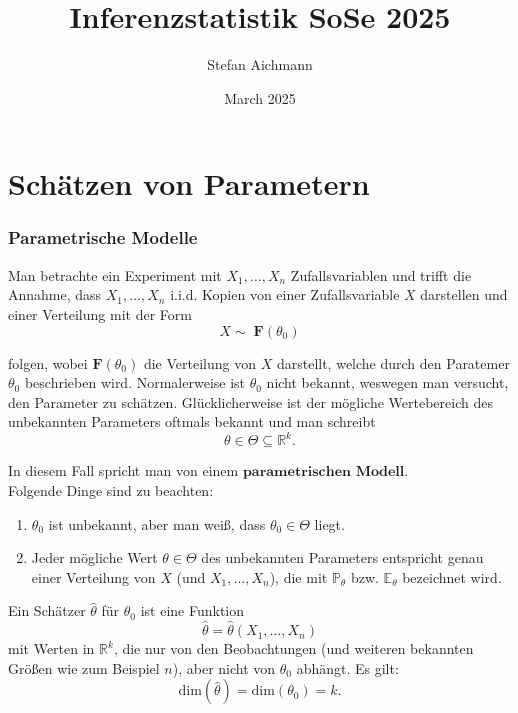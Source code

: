\documentclass[10pt]{article}
\title{Inferenzstatistik SoSe 2025}
\author{Stefan Aichmann}
\date{March 2025}
\newcommand{\FZV}{X_1, \ldots, X_n} %
\newcommand{\IR}{\mathbb{R}} %
\begin{document}
	
	\maketitle \newpage
	\tableofcontents \newpage
	
	\part{Schätzen von Parametern}
	
	\section{Parametrische Modelle}
	Man betrachte ein Experiment mit $\FZV$ Zufallsvariablen und trifft die Annahme, dass $\FZV$ i.i.d. Kopien von einer Zufallsvariable $X$ darstellen und einer Verteilung mit der Form
	\begin{equation*}
	 X \sim \; \textbf{F}(\theta_0)
	\end{equation*}
	
	\noindent folgen, wobei $\textbf{F}(\theta_0)$ die Verteilung von $X$ darstellt, welche durch den Paratemer $\theta_0$ beschrieben wird. Normalerweise ist $\theta_0$ nicht bekannt, weswegen  man versucht, den Parameter zu schätzen. Glücklicherweise ist der mögliche Wertebereich des unbekannten Parameters oftmals bekannt und man schreibt
	\begin{equation*}
		\theta \in \Theta \subseteq \IR^k.
	\end{equation*}
	
	\noindent In diesem Fall spricht man von einem $\textbf{parametrischen Modell}$.\\
	Folgende Dinge sind zu beachten: 
	
	\begin{enumerate}
      \item $\theta_0$ ist unbekannt, aber man weiß, dass $\theta_0 \in \Theta$ liegt. 
      \item  Jeder mögliche Wert $\theta \in \Theta$ des unbekannten Parameters entspricht genau einer Verteilung von $X$ (und $\FZV$), die mit $\mathbb{P}_\theta$ bzw. $\mathbb{E}_\theta$ bezeichnet wird.
	\end{enumerate}
	
	
	\begin{Definition}
		Ein Schätzer $\hat{\theta}$ für $\theta_0$ ist eine Funktion 
		\begin{equation*}
				\hat{\theta} = \hat{\theta} (\FZV)
		\end{equation*}
	 mit Werten in $\IR ^k$, die nur von den Beobachtungen (und weiteren bekannten Größen wie zum Beispiel $n$), aber nicht von $\theta_0$ abhängt.
	 Es gilt:
	 \begin{equation*}
	 	\text{dim}(\hat{\theta}) = \text{dim}(\theta_0) = k.
	 \end{equation*}
	\end{Definition}
	 
\end{document}
